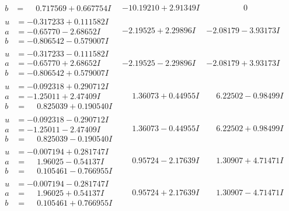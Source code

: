 \documentclass[1p]{elsarticle_modified}
\theoremstyle{definition}
\begin{document}
$$\begin{array}{c|c|c}
\begin{aligned}
b &= \phantom{-}0.717569 + 0.667754 I\end{aligned}
 & -10.19210 + 2.91349 I & \phantom{-0.000000 } 0 \\ \hline\begin{aligned}
u &= -0.317233 + 0.111582 I \\
a &= -0.65770 - 2.68652 I \\
b &= -0.806542 - 0.579007 I\end{aligned}
 & -2.19525 + 2.29896 I & -2.08179 - 3.93173 I \\ \hline\begin{aligned}
u &= -0.317233 - 0.111582 I \\
a &= -0.65770 + 2.68652 I \\
b &= -0.806542 + 0.579007 I\end{aligned}
 & -2.19525 - 2.29896 I & -2.08179 + 3.93173 I \\ \hline\begin{aligned}
u &= -0.092318 + 0.290712 I \\
a &= -1.25011 + 2.47409 I \\
b &= \phantom{-}0.825039 + 0.190540 I\end{aligned}
 & \phantom{-}1.36073 + 0.44955 I & \phantom{-}6.22502 - 0.98499 I \\ \hline\begin{aligned}
u &= -0.092318 - 0.290712 I \\
a &= -1.25011 - 2.47409 I \\
b &= \phantom{-}0.825039 - 0.190540 I\end{aligned}
 & \phantom{-}1.36073 - 0.44955 I & \phantom{-}6.22502 + 0.98499 I \\ \hline\begin{aligned}
u &= -0.007194 + 0.281747 I \\
a &= \phantom{-}1.96025 - 0.54137 I \\
b &= \phantom{-}0.105461 - 0.766955 I\end{aligned}
 & \phantom{-}0.95724 - 2.17639 I & \phantom{-}1.30907 + 4.71471 I \\ \hline\begin{aligned}
u &= -0.007194 - 0.281747 I \\
a &= \phantom{-}1.96025 + 0.54137 I \\
b &= \phantom{-}0.105461 + 0.766955 I\end{aligned}
 & \phantom{-}0.95724 + 2.17639 I & \phantom{-}1.30907 - 4.71471 I \\ \hline\begin{aligned}

\end{aligned}
\end{array}$$
\end{document}
